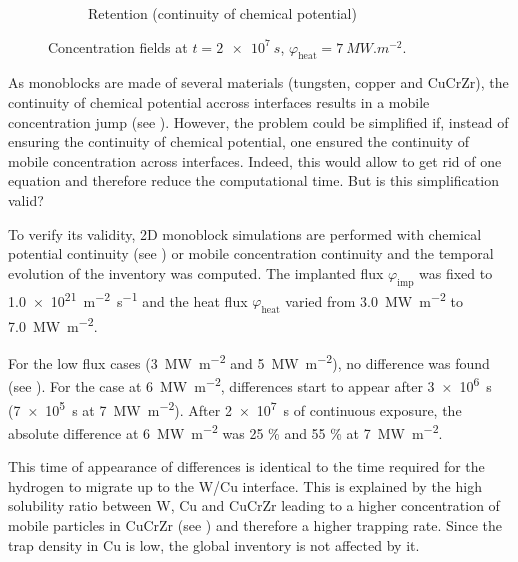 \begin{figure}
\begin{subfigure}{0.5\linewidth}
        \caption{Retention (continuity of chemical potential)}
    \end{subfigure}
    \caption{Concentration fields at $t=\SI{2e7}{s}$, $\varphi_\mathrm{heat} = \SI{7}{MW.m^{-2}}$.}
\end{figure}

As monoblocks are made of several materials (tungsten, copper and CuCrZr), the continuity of chemical potential accross interfaces results in a mobile concentration jump (see ).
However, the problem could be simplified if, instead of ensuring the continuity of chemical potential, one ensured the continuity of mobile concentration across interfaces.
Indeed, this would allow to get rid of one equation and therefore reduce the computational time.
But is this simplification valid?

To verify its validity, 2D monoblock simulations are performed with chemical potential continuity (see ) or mobile concentration continuity and the temporal evolution of the inventory was computed.
The implanted flux $\varphi_\mathrm{imp}$ was fixed to \SI{1.0e21}{m^{-2}.s^{-1}} and the heat flux $\varphi_\mathrm{heat}$ varied from \SI{3.0}{MW.m^{-2}} to \SI{7.0}{MW.m^{-2}}.

For the low flux cases (\SI{3}{MW.m^{-2}} and \SI{5}{MW.m^{-2}}), no difference was found (see ).
For the case at \SI{6}{MW.m^{-2}}, differences start to appear after \SI{3e6}{s} (\SI{7e5}{s} at \SI{7}{MW.m^{-2}}).
After \SI{2e7}{s} of continuous exposure, the absolute difference at \SI{6}{MW.m^{-2}} was 25 \% and 55 \% at \SI{7}{MW.m^{-2}}.

This time of appearance of differences is identical to the time required for the hydrogen to migrate up to the W/Cu interface.
This is explained by the high solubility ratio between W, Cu and CuCrZr leading to a higher concentration of mobile particles in CuCrZr (see ) and therefore a higher trapping rate.
Since the trap density in Cu is low, the global inventory is not affected by it.



